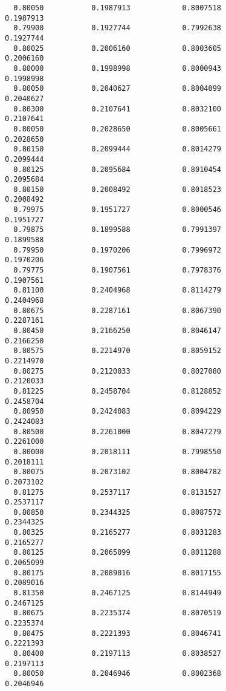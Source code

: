 \documentclass[
  letterpaper,
  DIV=11,
  numbers=noendperiod]{scrartcl}
\begin{document}
\begin{verbatim}
  0.80050           0.1987913            0.8007518            0.1987913     
  0.79900           0.1927744            0.7992638            0.1927744     
  0.80025           0.2006160            0.8003605            0.2006160     
  0.80000           0.1998998            0.8000943            0.1998998     
  0.80050           0.2040627            0.8004099            0.2040627     
  0.80300           0.2107641            0.8032100            0.2107641     
  0.80050           0.2028650            0.8005661            0.2028650     
  0.80150           0.2099444            0.8014279            0.2099444     
  0.80125           0.2095684            0.8010454            0.2095684     
  0.80150           0.2008492            0.8018523            0.2008492     
  0.79975           0.1951727            0.8000546            0.1951727     
  0.79875           0.1899588            0.7991397            0.1899588     
  0.79950           0.1970206            0.7996972            0.1970206     
  0.79775           0.1907561            0.7978376            0.1907561     
  0.81100           0.2404968            0.8114279            0.2404968     
  0.80675           0.2287161            0.8067390            0.2287161     
  0.80450           0.2166250            0.8046147            0.2166250     
  0.80575           0.2214970            0.8059152            0.2214970     
  0.80275           0.2120033            0.8027080            0.2120033     
  0.81225           0.2458704            0.8128852            0.2458704     
  0.80950           0.2424083            0.8094229            0.2424083     
  0.80500           0.2261000            0.8047279            0.2261000     
  0.80000           0.2018111            0.7998550            0.2018111     
  0.80075           0.2073102            0.8004782            0.2073102     
  0.81275           0.2537117            0.8131527            0.2537117     
  0.80850           0.2344325            0.8087572            0.2344325     
  0.80325           0.2165277            0.8031283            0.2165277     
  0.80125           0.2065099            0.8011288            0.2065099     
  0.80175           0.2089016            0.8017155            0.2089016     
  0.81350           0.2467125            0.8144949            0.2467125     
  0.80675           0.2235374            0.8070519            0.2235374     
  0.80475           0.2221393            0.8046741            0.2221393     
  0.80400           0.2197113            0.8038527            0.2197113     
  0.80050           0.2046946            0.8002368            0.2046946     

\end{verbatim}
\end{document}

